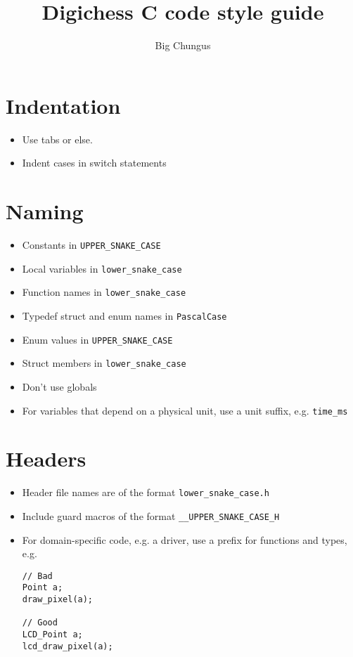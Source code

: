 \documentclass{article}
\title{Digichess C code style guide}
\author{Big Chungus}
\begin{document}
\maketitle

\section{Indentation}

\begin{itemize}
	\item Use tabs or else.
	\item Indent cases in switch statements
\end{itemize}

\section{Naming}

\begin{itemize}
	\item Constants in \lstinline{UPPER_SNAKE_CASE}
	\item Local variables in \lstinline{lower_snake_case}
	\item Function names in \lstinline{lower_snake_case}
	\item Typedef struct and enum names in \lstinline{PascalCase}
	\item Enum values in \lstinline{UPPER_SNAKE_CASE}
	\item Struct members in \lstinline{lower_snake_case}
	\item Don't use globals
	\item For variables that depend on a physical unit, use a unit suffix, e.g. \lstinline{time_ms}
\end{itemize}

\section{Headers}

\begin{itemize}
	\item Header file names are of the format \lstinline{lower_snake_case.h}
	\item Include guard macros of the format \lstinline{__UPPER_SNAKE_CASE_H}
	\item For domain-specific code, e.g. a driver, use a prefix for functions and types, e.g.
	
	\begin{lstlisting}
// Bad
Point a;
draw_pixel(a);

// Good
LCD_Point a;
lcd_draw_pixel(a);
	\end{lstlisting}
\end{itemize}
\end{document}

